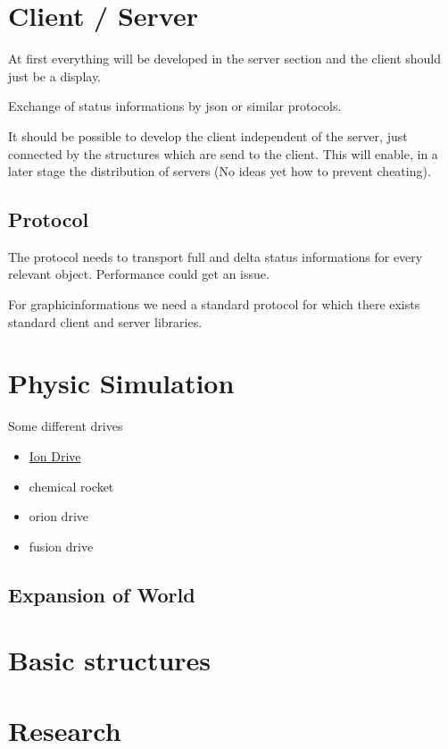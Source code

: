 \section{Client / Server}
At first everything will be developed in the server section and the client should just be a display.

Exchange of status informations by json or similar protocols.

It should be possible to develop the client independent of the server, just connected by the structures which are send to the client. This will enable, in a later stage the distribution of servers (No ideas yet how to prevent cheating).

\subsection{Protocol}

The protocol needs to transport full and delta status informations for every relevant object. Performance could get an issue.

For graphicinformations we need a standard protocol for which there exists standard client and server libraries.

\section{Physic Simulation}



Some different drives
\begin{itemize}
 \item \href{https://en.wikipedia.org/wiki/Ion_thruster}{Ion Drive}
 \item chemical rocket
 \item orion drive
 \item fusion drive
\end{itemize}

\subsection{Expansion of World}

\section{Basic structures}


\section{Research}

